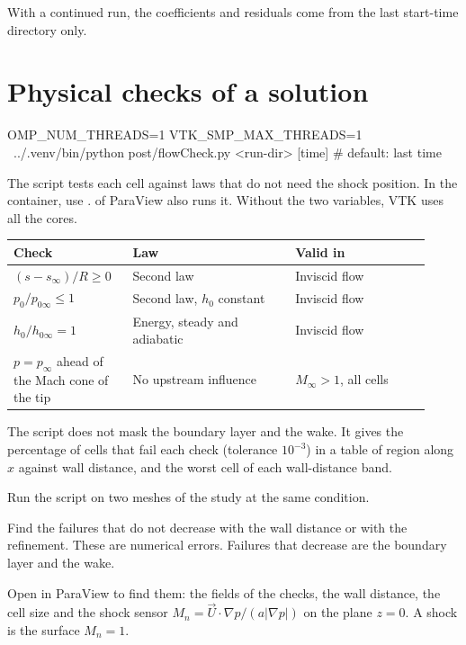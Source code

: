 With a continued run, the coefficients and residuals come from the last start-time
directory only.

\section{Physical checks of a solution}\label{sec:flowcheck}

\begin{shell}
OMP_NUM_THREADS=1 VTK_SMP_MAX_THREADS=1 \
    ../.venv/bin/python post/flowCheck.py <run-dir> [time]   # default: last time
\end{shell}

The script tests each cell against laws that do not need the shock position. In the
container, use \cmd{python3}. \cmd{pvpython} of ParaView also runs it. Without the two
variables, VTK uses all the cores.

\begin{longtable}{@{}P{0.26\linewidth} P{0.36\linewidth} P{0.30\linewidth}@{}}
\toprule
Check & Law & Valid in \\
\midrule
\endhead
$(s - s_\infty)/R \geq 0$ & Second law & Inviscid flow \\
$p_0/p_{0\infty} \leq 1$ & Second law, $h_0$ constant & Inviscid flow \\
$h_0/h_{0\infty} = 1$ & Energy, steady and adiabatic & Inviscid flow \\
$p = p_\infty$ ahead of the Mach cone of the tip & No upstream influence & $M_\infty > 1$, all cells \\
\bottomrule
\end{longtable}

The script does not mask the boundary layer and the wake. It gives the percentage of
cells that fail each check (tolerance $10^{-3}$) in a table of region along $x$ against
wall distance, and the worst cell of each wall-distance band.

\begin{steps}
\item Run the script on two meshes of the study at the same condition.
\item Find the failures that do not decrease with the wall distance or with the
  refinement. These are numerical errors. Failures that decrease are the boundary layer
  and the wake.
\item Open  in ParaView to
  find them: the fields of the checks, the wall distance, the cell size and the shock
  sensor $M_n = \vec{U}\cdot\nabla p/(a|\nabla p|)$ on the plane $z = 0$. A shock is
  the surface $M_n = 1$.
\end{steps}

